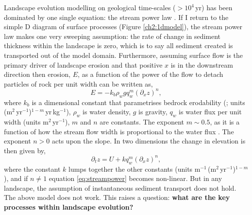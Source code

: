 Landscape evolution modelling on geological time-scales ($>10^{4}$\,yr) has been dominated by one single equation: the stream power law \citep[see][]{howard-1983,howard-1994}. If I return to the simple D diagram of surface processes (Figure \ref{ch2:1dmodel}), the stream power law makes one very sweeping assumption: the rate of change in sediment thickness within the landscape is zero, which is to say all sediment created is transported out of the model domain. Furthermore, assuming surface flow is the primary driver of landscape erosion and that positive $x$ is in the downstream direction then erosion, $E$, as a function of the power of the flow to detach particles of rock per unit width can be written as,
\begin{equation}
E = -k_{b}\rho_{w}gq_{w}^{m}\left(\partial_{x}z\right)^{n},
\label{eq:streampower-inv}
\end{equation}
where $k_{b}$ is a dimensional constant that parametrises bedrock erodability (\citealp{howard-1983}; units (m$^{2}$\,yr$^{-1}$)$^{1-m}$\,yr\,kg$^{-1}$), $\rho_{w}$ is water density, $g$ is gravity, $q_{w}$ is water flux per unit width (units m$^{2}$\,yr$^{-1}$),  $m$ and $n$ are constants. The exponent $m \sim 0.5$, as it is a function of how the stream flow width is proportional to the water flux \citep[e.g.][]{lacey-1930,leopold-1953,whittaker-etal-2007}. The exponent $n>0$ acts upon the slope. In two dimensions the change in elevation is then given by,
\begin{equation}
\partial_{t}z = U + kq_{w}^{m}\left(\partial_{x}z\right)^{n},
\label{eq:streampower}
\end{equation}
where the constant $k$ lumps together the other constants (units m$^{-1}$\,(m$^{2}$\,yr$^{-1}$)$^{1-m}$), and if $n\neq1$ equation \ref{eq:streampower} becomes non-linear. But in any landscape, the assumption of instantaneous sediment transport does not hold. The above model does not work. This raises a question: {\bf what are the key processes within landscape evolution?}

